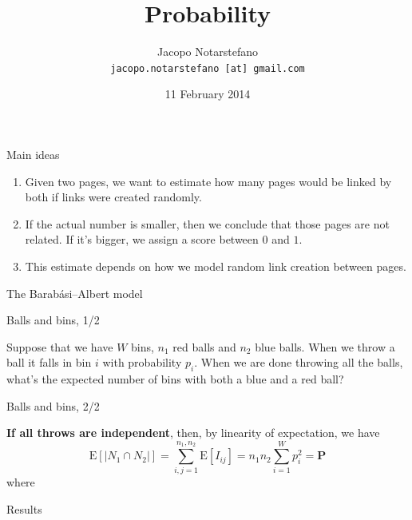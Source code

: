 \documentclass[12pt]{beamer}
\title{Probability}
\author[Jacopo Notarstefano]{
    Jacopo Notarstefano\\
    \texttt{jacopo.notarstefano [at] gmail.com}
}
\date{11 February 2014}
\begin{document}
    \begin{frame}[plain]
        \titlepage
    \end{frame}

    \begin{frame}{Main ideas}
        \begin{enumerate}
            \item Given two pages, we want to estimate how many pages would be linked
            by both if links were created randomly.
            \item If the actual number is smaller, then we conclude that those pages
            are not related. If it's bigger, we assign a score between \(0\) and \(1\).
            \item This estimate depends on how we model random link creation between
            pages.
        \end{enumerate}
    \end{frame}

    \begin{frame}{The Barabási–Albert model}
    \end{frame}

    \begin{frame}{Balls and bins, 1/2}
        \begin{problem}
            Suppose that we have \(W\) bins, \(n_1\) red balls and \(n_2\) blue balls.
            When we throw a ball it falls in bin \(i\) with probability \(p_i\). When
            we are done throwing all the balls, what's the expected number of bins with
            both a blue and a red ball?
        \end{problem}
    \end{frame}

    \begin{frame}{Balls and bins, 2/2}
        \begin{solution}
            \textbf{If all throws are independent}, then, by linearity of expectation,
            we have
            \[
                \mathrm{E}[\vert N_1\cap N_2\vert] = \sum_{i,j=1}^{n_1,n_2}{\mathrm{E}[I_{ij}]} = n_{1}n_{2}\sum_{i=1}^{W}{p_{i}^2} = \mathbf{P}
            \]
            where 
        \end{solution}
    \end{frame}

    \begin{frame}{Results}
        \begin{figure}
        \end{figure}
    \end{frame}
\end{document}
